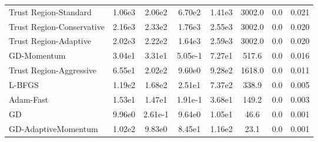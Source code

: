 \documentclass{article}
\begin{document}
\begin{table}[htbp]
{\begin{tabular}{p{2.5cm}*{7}{c}}
Trust Region-Standard & 1.06e3 & 2.06e2 & 6.70e2 & 1.41e3 & 3002.0 & 0.0 & 0.021 \\
Trust Region-Conservative & 2.16e3 & 2.33e2 & 1.76e3 & 2.55e3 & 3002.0 & 0.0 & 0.020 \\
Trust Region-Adaptive & 2.02e3 & 2.22e2 & 1.64e3 & 2.59e3 & 3002.0 & 0.0 & 0.020 \\
GD-Momentum & 3.04e1 & 3.31e1 & 5.05e-1 & 7.27e1 & 517.6 & 0.0 & 0.016 \\
Trust Region-Aggressive & 6.55e1 & 2.02e2 & 9.60e0 & 9.28e2 & 1618.0 & 0.0 & 0.011 \\
L-BFGS & 1.19e2 & 1.68e2 & 2.51e1 & 7.37e2 & 338.9 & 0.0 & 0.005 \\
Adam-Fast & 1.53e1 & 1.47e1 & 1.91e-1 & 3.68e1 & 149.2 & 0.0 & 0.003 \\
GD & 9.96e0 & 2.61e-1 & 9.64e0 & 1.05e1 & 46.6 & 0.0 & 0.001 \\
GD-AdaptiveMomentum & 1.02e2 & 9.83e0 & 8.45e1 & 1.16e2 & 23.1 & 0.0 & 0.001 \\
\bottomrule
\end{tabular}
}
\end{table}
\end{document}
